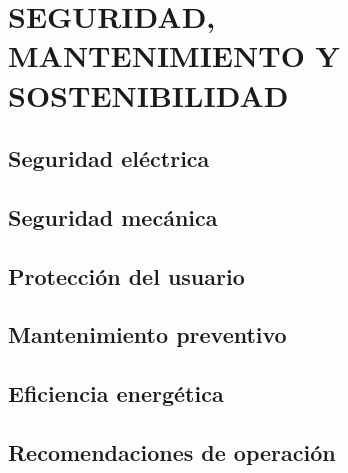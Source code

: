 \section{SEGURIDAD, MANTENIMIENTO Y SOSTENIBILIDAD}

\subsection{Seguridad eléctrica}

\subsection{Seguridad mecánica}

\subsection{Protección del usuario}

\subsection{Mantenimiento preventivo}

\subsection{Eficiencia energética}

\subsection{Recomendaciones de operación}